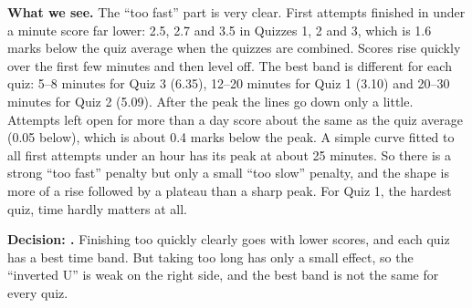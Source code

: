 \textbf{What we see.} The ``too fast'' part is very clear. First attempts
finished in under a minute score far lower: 2.5, 2.7 and 3.5 in Quizzes 1, 2
and 3, which is 1.6 marks below the quiz average when the quizzes are combined.
Scores rise quickly over the first few minutes and then level off. The best
band is different for each quiz: 5--8 minutes for Quiz 3 (6.35), 12--20 minutes
for Quiz 1 (3.10) and 20--30 minutes for Quiz 2 (5.09). After the peak the
lines go down only a little. Attempts left open for more than a day score
about the same as the quiz average (0.05 below), which is about 0.4 marks
below the peak. A simple curve fitted to all first attempts under an hour has
its peak at about 25 minutes. So there is a strong ``too fast'' penalty but
only a small ``too slow'' penalty, and the shape is more of a rise followed by a
plateau than a sharp peak. For Quiz 1, the hardest quiz, time hardly matters at
all.

\begin{decision}
\textbf{Decision: \partly.} Finishing too quickly clearly goes with lower
scores, and each quiz has a best time band. But taking too long has only a
small effect, so the ``inverted U'' is weak on the right side, and the best
band is not the same for every quiz.
\end{decision}
